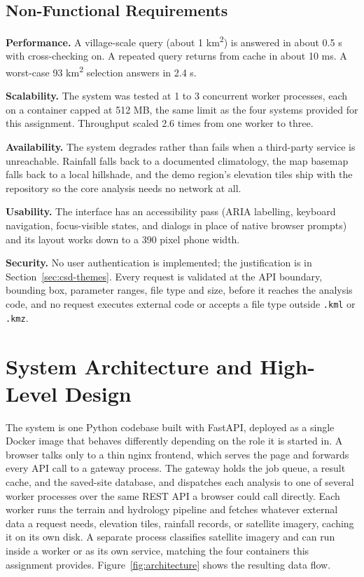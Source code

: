 \documentclass[manuscript,screen,review]{acmart}
\begin{document}
\subsection{Non-Functional Requirements}
\textbf{Performance.} A village-scale query (about 1 km\textsuperscript{2}) is answered
in about 0.5 s with cross-checking on. A repeated query returns from cache in about
10 ms. A worst-case 93 km\textsuperscript{2} selection answers in 2.4 s.

\textbf{Scalability.} The system was tested at 1 to 3 concurrent worker processes, each
on a container capped at 512 MB, the same limit as the four systems provided for this
assignment. Throughput scaled 2.6 times from one worker to three.

\textbf{Availability.} The system degrades rather than fails when a third-party service
is unreachable. Rainfall falls back to a documented climatology, the map basemap falls
back to a local hillshade, and the demo region's elevation tiles ship with the
repository so the core analysis needs no network at all.

\textbf{Usability.} The interface has an accessibility pass (ARIA labelling, keyboard
navigation, focus-visible states, and dialogs in place of native browser prompts) and
its layout works down to a 390 pixel phone width.

\textbf{Security.} No user authentication is implemented; the justification is in
Section~\ref{sec:csd-themes}. Every request is validated at the API boundary, bounding
box, parameter ranges, file type and size, before it reaches the analysis code, and no
request executes external code or accepts a file type outside \texttt{.kml} or
\texttt{.kmz}.

\section{System Architecture and High-Level Design}
\label{sec:architecture}

The system is one Python codebase built with FastAPI, deployed as a single Docker
image that behaves differently depending on the role it is started in. A browser talks
only to a thin nginx frontend, which serves the page and forwards every API call to a
gateway process. The gateway holds the job queue, a result cache, and the saved-site
database, and dispatches each analysis to one of several worker processes over the same
REST API a browser could call directly. Each worker runs the terrain and hydrology
pipeline and fetches whatever external data a request needs, elevation tiles, rainfall
records, or satellite imagery, caching it on its own disk. A separate process classifies
satellite imagery and can run inside a worker or as its own service, matching the four
containers this assignment provides. Figure~\ref{fig:architecture} shows the resulting
data flow.
\end{document}
